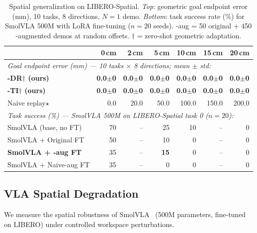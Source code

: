 \begin{table}[ht]
\centering
\small
\caption{Spatial generalization on LIBERO-Spatial.
\textit{Top}: geometric goal endpoint error (mm), 10 tasks, 8 directions, $N{=}1$ demo.
\textit{Bottom}: task success rate (\%) for SmolVLA 500M with LoRA fine-tuning ($n{=}20$ seeds).
\dhb{}-aug = 50 original + 450 \dhb{}-augmented demos at random offsets.
$\dagger$ = zero-shot geometric adaptation.}
\label{tab:spatial_main}
\begin{tabular}{lrrrrrr}
\toprule
& 0\,cm & 2\,cm & 5\,cm & 10\,cm & 15\,cm & 20\,cm \\
\midrule
\multicolumn{7}{l}{\textit{Goal endpoint error (mm) — 10 tasks $\times$ 8 directions; mean $\pm$ std:}} \\
\midrule
\textbf{\dhb{}-DR$\dagger$ (ours)}  & \textbf{0.0{\tiny$\pm$0}} & \textbf{0.0{\tiny$\pm$0}} & \textbf{0.0{\tiny$\pm$0}} & \textbf{0.0{\tiny$\pm$0}} & \textbf{0.0{\tiny$\pm$0}} & \textbf{0.0{\tiny$\pm$0}} \\
\textbf{\dhb{}-TI$\dagger$ (ours)}  & \textbf{0.0{\tiny$\pm$0}} & \textbf{0.0{\tiny$\pm$0}} & \textbf{0.0{\tiny$\pm$0}} & \textbf{0.0{\tiny$\pm$0}} & \textbf{0.0{\tiny$\pm$0}} & \textbf{0.0{\tiny$\pm$0}} \\
Naive replay$\star$ & 0.0 & 20.0 & 50.0 & 100.0 & 150.0 & 200.0 \\
\midrule
\multicolumn{7}{l}{\textit{Task success (\%) — SmolVLA 500M on LIBERO-Spatial task 0 ($n{=}20$):}} \\
\midrule
SmolVLA (base, no FT)     & 70 & -- & 25 & 10 & -- & 0 \\
SmolVLA + Original FT     & 50 & -- & 10 &  0 & -- & 0 \\
\textbf{SmolVLA + \dhb{}-aug FT}     & 35 & -- & \textbf{15} &  0 & -- & 0 \\
SmolVLA + Naive-aug FT    & 35 & -- &  0 &  0 & -- & 0 \\
\bottomrule
\end{tabular}
\end{table}

\subsection{VLA Spatial Degradation}

We measure the spatial robustness of SmolVLA~\cite{smolvla2025} (500M parameters,
fine-tuned on LIBERO) under controlled workspace perturbations.

